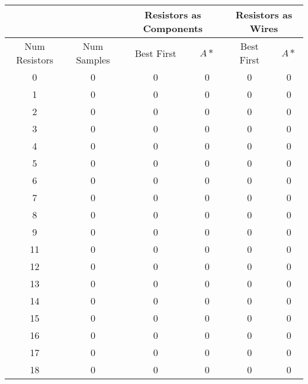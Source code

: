 \begin{table}[H]
\begin{center}
\begin{singlespace}
\begin{tabular}{| c | c | c | c | c | c |}
\hline
 & & \multicolumn{2}{|c|}{Resistors as Components} & \multicolumn{2}{|c|}{
 Resistors as Wires} \\
\hline
Num Resistors & Num Samples & Best First & $A*$ & Best First & $A*$ \\
\hline\hline
0 & 0 & 0 & 0 & 0 & 0 \\
1 & 0 & 0 & 0 & 0 & 0 \\
2 & 0 & 0 & 0 & 0 & 0 \\
3 & 0 & 0 & 0 & 0 & 0 \\
4 & 0 & 0 & 0 & 0 & 0 \\
5 & 0 & 0 & 0 & 0 & 0 \\
6 & 0 & 0 & 0 & 0 & 0 \\
7 & 0 & 0 & 0 & 0 & 0 \\
8 & 0 & 0 & 0 & 0 & 0 \\
9 & 0 & 0 & 0 & 0 & 0 \\
11 & 0 & 0 & 0 & 0 & 0 \\
12 & 0 & 0 & 0 & 0 & 0 \\
13 & 0 & 0 & 0 & 0 & 0 \\
14 & 0 & 0 & 0 & 0 & 0 \\
15 & 0 & 0 & 0 & 0 & 0 \\
16 & 0 & 0 & 0 & 0 & 0 \\
17 & 0 & 0 & 0 & 0 & 0 \\
18 & 0 & 0 & 0 & 0 & 0 \\
\hline
\end{tabular}
\end{singlespace}
\end{center}
\end{table}
